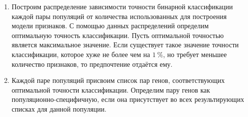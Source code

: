 \begin{enumerate}
	\item Построим распределение зависимости точности бинарной классификации каждой пары популяций от количества использованных для построения модели признаков. С помощью данных распределений определим оптимальную точность классификации. Пусть оптимальной точностью является максимальное значение. Если существует такое значение точности классификации, которое хуже не более чем на $1~\%$, но требует меньшее количество признаков, то предпочтение отдаётся ему.
	\item Каждой паре популяций присвоим список пар генов, соответствующих оптимальной точности классификации. Определим пару генов как популяционно-специфичную, если она присутствует во всех результирующих списках для данной популяции.
\end{enumerate}

